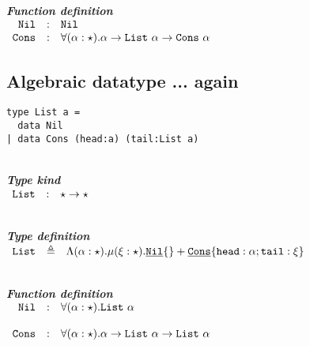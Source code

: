 \documentclass{article}[11pt]
\newcommand{\subsubsubsection}[1]
{
    ~\\
    {\bf {\em #1}} \\
}
\newcommand{\term}[1]{\verb~#1~}
\newcommand{\cons}[1]{\underline{\verb~#1~}}
\begin{document}
    \subsubsubsection{Function definition}

    \noindent
    \begin{math}
        \begin{array}{rclp{5cm}}
            \term{Nil}  & : & \term{Nil}                                                                                   \\
            \term{Cons} & : & \forall(\alpha:\star).\alpha \rightarrow \term{List}~\alpha \rightarrow \term{Cons} ~ \alpha \\
        \end{array}
    \end{math}

    \subsection{Algebraic datatype ... again}

    \begin{verbatim}
type List a =
  data Nil
| data Cons (head:a) (tail:List a)
    \end{verbatim}

    \subsubsubsection{Type kind}

    \noindent
    \begin{math}
        \begin{array}{rclp{5cm}}
            \term{List} & : & \star \rightarrow \star
        \end{array}
    \end{math}

    \subsubsubsection{Type definition}

    \noindent
    \begin{math}
        \begin{array}{rclp{5cm}}
            \term{List} & \triangleq & \Lambda(\alpha:\star).\mu(\xi:\star).\cons{Nil}\{\} + \cons{Cons}\{ \term{head} :\alpha; \term{tail} : \xi \}
        \end{array}
    \end{math}

    \subsubsubsection{Function definition}

    \noindent
    \begin{math}
        \begin{array}{rclp{5cm}}
            \term{Nil}  & : & \forall(\alpha:\star).\term{List} ~ \alpha \\                                                                                    \\
            \term{Cons} & : & \forall(\alpha:\star).\alpha \rightarrow \term{List}~\alpha \rightarrow \term{List} ~ \alpha
        \end{array}
    \end{math}
\end{document}

